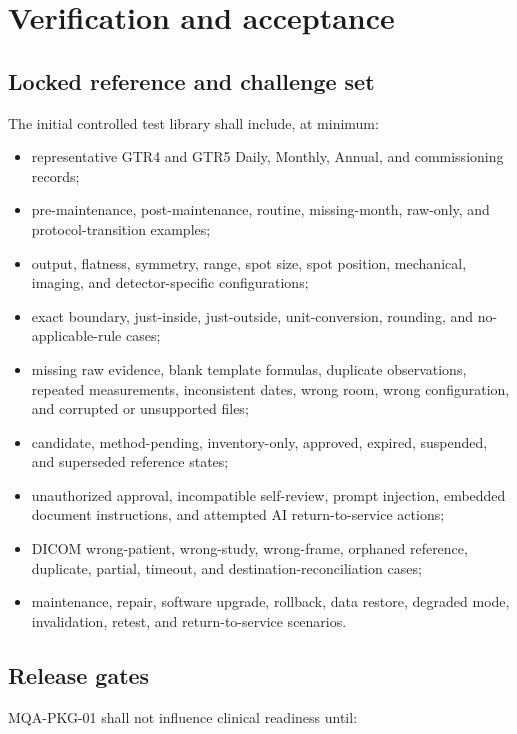 \documentclass[11pt,letterpaper]{article}
\begin{document}
\section{Verification and acceptance}

\subsection{Locked reference and challenge set}

The initial controlled test library shall include, at minimum:

\begin{itemize}
\item representative GTR4 and GTR5 Daily, Monthly, Annual, and commissioning records;
\item pre-maintenance, post-maintenance, routine, missing-month, raw-only, and protocol-transition examples;
\item output, flatness, symmetry, range, spot size, spot position, mechanical, imaging, and detector-specific configurations;
\item exact boundary, just-inside, just-outside, unit-conversion, rounding, and no-applicable-rule cases;
\item missing raw evidence, blank template formulas, duplicate observations, repeated measurements, inconsistent dates, wrong room, wrong configuration, and corrupted or unsupported files;
\item candidate, method-pending, inventory-only, approved, expired, suspended, and superseded reference states;
\item unauthorized approval, incompatible self-review, prompt injection, embedded document instructions, and attempted AI return-to-service actions;
\item DICOM wrong-patient, wrong-study, wrong-frame, orphaned reference, duplicate, partial, timeout, and destination-reconciliation cases;
\item maintenance, repair, software upgrade, rollback, data restore, degraded mode, invalidation, retest, and return-to-service scenarios.
\end{itemize}

\subsection{Release gates}

MQA-PKG-01 shall not influence clinical readiness until:
\end{document}
